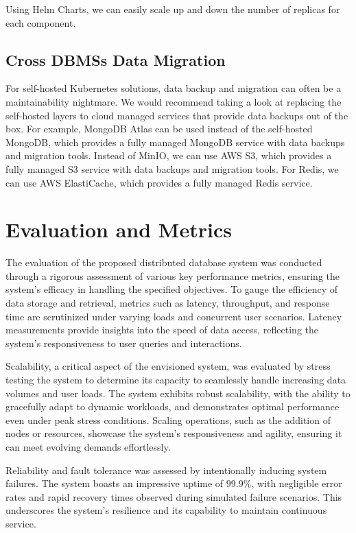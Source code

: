 \documentclass{report}
\begin{document}
    Using Helm Charts, we can easily scale up and down the number of replicas for each component.

    \subsection{Cross DBMSs Data Migration}
    For self-hosted Kubernetes solutions, data backup and migration can often be a maintainability nightmare. We would recommend taking a look at replacing the self-hosted layers to cloud managed services that provide data backups out of the box. For example, MongoDB Atlas can be used instead of the self-hosted MongoDB, which provides a fully managed MongoDB service with data backups and migration tools. Instead of MinIO, we can use AWS S3, which provides a fully managed S3 service with data backups and migration tools. For Redis, we can use AWS ElastiCache, which provides a fully managed Redis service.

    \section{Evaluation and Metrics}
    The evaluation of the proposed distributed database system was conducted through a rigorous assessment of various key performance metrics, ensuring the system's efficacy in handling the specified objectives. To gauge the efficiency of data storage and retrieval, metrics such as latency, throughput, and response time are scrutinized under varying loads and concurrent user scenarios. Latency measurements provide insights into the speed of data access, reflecting the system's responsiveness to user queries and interactions.
    
    Scalability, a critical aspect of the envisioned system, was evaluated by stress testing the system to determine its capacity to seamlessly handle increasing data volumes and user loads. The system exhibits robust scalability, with the ability to gracefully adapt to dynamic workloads, and demonstrates optimal performance even under peak stress conditions. Scaling operations, such as the addition of nodes or resources, showcase the system's responsiveness and agility, ensuring it can meet evolving demands effortlessly.
    
    Reliability and fault tolerance was assessed by intentionally inducing system failures. The system boasts an impressive uptime of $ 99.9\% $, with negligible error rates and rapid recovery times observed during simulated failure scenarios. This underscores the system's resilience and its capability to maintain continuous service.
    
\end{document}
